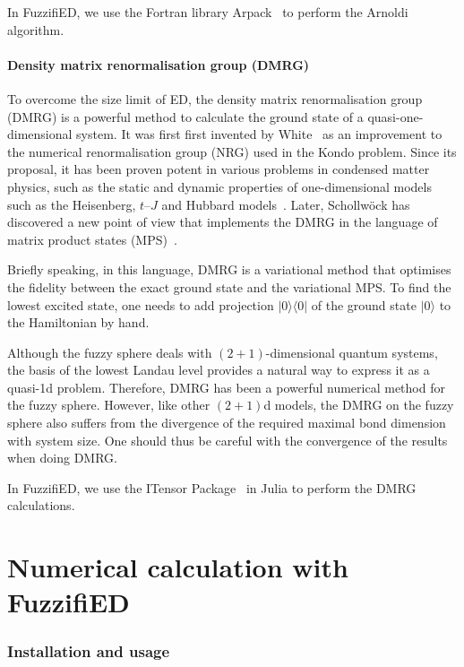 \documentclass{timesjhep}
\begin{document}
In FuzzifiED, we use the Fortran library Arpack~\cite{Arpack1998} to perform the Arnoldi algorithm. 

\subsection{Density matrix renormalisation group (DMRG)}

To overcome the size limit of ED, the density matrix renormalisation group (DMRG) is a powerful method to calculate the ground state of a quasi-one-dimensional system. It was first first invented by White~\cite{White1992DMRG} as an improvement to the numerical renormalisation group (NRG) used in the Kondo problem. Since its proposal, it has been proven potent in various problems in condensed matter physics, such as the static and dynamic properties of one-dimensional models such as the Heisenberg, $t$--$J$ and Hubbard models~\cite{Schollwock2005DMRG}. Later, Schollw\"ock has discovered a new point of view that implements the DMRG in the language of matrix product states (MPS)~\cite{Schollwoeck2010DMRG}. 

Briefly speaking, in this language, DMRG is a variational method that optimises the fidelity between the exact ground state and the variational MPS. To find the lowest excited state, one needs to add projection $|0\rangle\langle 0|$ of the ground state $|0\rangle$ to the Hamiltonian by hand. 

Although the fuzzy sphere deals with $(2+1)$-dimensional quantum systems, the basis of the lowest Landau level provides a natural way to express it as a quasi-1d problem. Therefore, DMRG has been a powerful numerical method for the fuzzy sphere. However, like other $(2+1)$d models, the DMRG on the fuzzy sphere also suffers from the divergence of the required maximal bond dimension with system size. One should thus be careful with the convergence of the results when doing DMRG. 

In FuzzifiED, we use the ITensor Package~\cite{ITensor} in Julia to perform the DMRG calculations. 

\cleardoublepage
\part{Numerical calculation with FuzzifiED}
\label{pt:numerics}

\section{Installation and usage}
\label{sec:usage}
\end{document}
